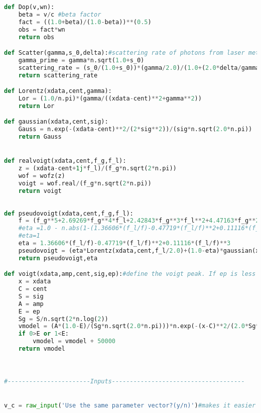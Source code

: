 {\begin{lstlisting}[language=Python,breaklines]
def Dop(v,wn):
	beta = v/c #beta factor
	fact = ((1.0+beta)/(1.0-beta))**(0.5)
	obs = fact*wn
	return obs

def Scatter(gamma,s_0,delta):#scattering rate of photons from laser metcalf pg.25
	gamma_prime = gamma*n.sqrt(1.0+s_0)
	scattering_rate = (s_0/(1.0+s_0))*(gamma/2.0)/(1.0+(2.0*delta/gamma_prime)**2)
	return scattering_rate

def Lorentz(xdata,cent,gamma):
	Lor = (1.0/n.pi)*(gamma/((xdata-cent)**2+gamma**2))
	return Lor

def gaussian(xdata,cent,sig):
	Gauss = n.exp(-(xdata-cent)**2/(2*sig**2))/(sig*n.sqrt(2.0*n.pi))
	return Gauss


def realvoigt(xdata,cent,f_g,f_l):
	z = (xdata-cent+1j*f_l)/(f_g*n.sqrt(2*n.pi))
	wof = wofz(z)
	voigt = wof.real/(f_g*n.sqrt(2*n.pi))
	return voigt
	
	
def pseudovoigt(xdata,cent,f_g,f_l):
	f = (f_g**5+2.69269*f_g**4*f_l+2.42843*f_g**3*f_l**2+4.47163*f_g**2*f_l**3+0.07842*f_g*f_l**4+f_l**5)**(1.0/5)
	#eta =1.0 - n.abs(1-(1.36606*(f_l/f)-0.47719*(f_l/f)**2+0.11116*(f_l/f)**3))
	#eta=1
	eta = 1.36606*(f_l/f)-0.47719*(f_l/f)**2+0.11116*(f_l/f)**3
	pseudovoigt = (eta*Lorentz(xdata,cent,f_l/2.0)+(1.0-eta)*gaussian(xdata,cent,f_g/2))
	return pseudovoigt,eta

def voigt(xdata,amp,cent,sig,ep):#define the voigt peak. If ep is less than 0 or greater than 1, mess up the profile
    x = xdata
    C = cent
    S = sig
    A = amp
    E = ep
    Sg = S/n.sqrt(2*n.log(2))
    vmodel = (A*(1.0-E)/(Sg*n.sqrt(2.0*n.pi)))*n.exp(-(x-C)**2/(2.0*Sg**2))+ ((E*A)/(n.pi))*(S)/((x-C)**2+S**2)
    if 0>E or 1<E:
    	vmodel = vmodel + 50000
    return vmodel



#-----------------------Inputs-------------------------------------


v_c = raw_input('Use the same parameter vector?(y/n)')#makes it easier to rerun things


\end{lstlisting}}

